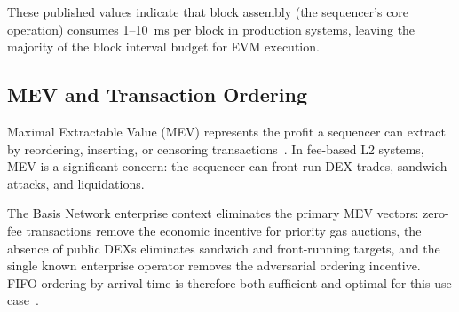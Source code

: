These published values indicate that block assembly (the sequencer's core operation)
consumes 1--10~ms per block in production systems, leaving the majority of the block
interval budget for EVM execution.

\subsection{MEV and Transaction Ordering}

Maximal Extractable Value (MEV) represents the profit a sequencer can extract by
reordering, inserting, or censoring transactions~\cite{daian2020flash}. In fee-based
L2 systems, MEV is a significant concern: the sequencer can front-run DEX trades,
sandwich attacks, and liquidations.

The Basis Network enterprise context eliminates the primary MEV vectors:
zero-fee transactions remove the economic incentive for priority gas auctions,
the absence of public DEXs eliminates sandwich and front-running targets,
and the single known enterprise operator removes the adversarial ordering incentive.
FIFO ordering by arrival time is therefore both sufficient and optimal for this
use case~\cite{kelkar2020order}.
